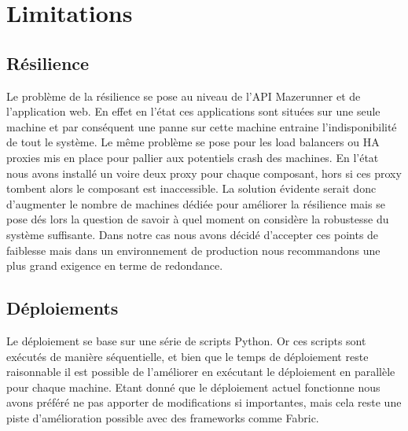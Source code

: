 \section{Limitations}

\subsection{Résilience}

Le problème de la résilience se pose au niveau de l'API Mazerunner et de l'application web.
En effet en l'état ces applications sont situées sur une seule machine et par conséquent une panne sur cette machine entraine l'indisponibilité de tout le système.
Le même problème se pose pour les load balancers ou HA proxies mis en place pour pallier aux potentiels crash des machines.
En l'état nous avons installé un voire deux proxy pour chaque composant, hors si ces proxy tombent alors le composant est inaccessible.
La solution évidente serait donc d'augmenter le nombre de machines dédiée pour améliorer la résilience mais se pose dés lors la question de savoir à quel moment on considère la robustesse du système suffisante.
Dans notre cas nous avons décidé d'accepter ces points de faiblesse mais dans un environnement de production nous recommandons une plus grand exigence en terme de redondance.

\subsection{Déploiements}

Le déploiement se base sur une série de scripts Python.
Or ces scripts sont exécutés de manière séquentielle, et bien que le temps de déploiement reste raisonnable il est possible de l'améliorer en exécutant le déploiement en parallèle pour chaque machine.
Etant donné que le déploiement actuel fonctionne nous avons préféré ne pas apporter de modifications si importantes, mais cela reste une piste d'amélioration possible avec des frameworks comme Fabric.
